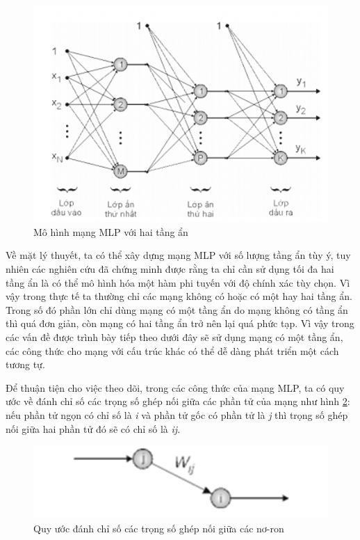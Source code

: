 \begin{figure}[H]
    \centering
    \includegraphics[scale=0.75]{./content/images/2-3.png}
    \caption{Mô hình mạng MLP với hai tầng ẩn}
    \label{fig:2-3}
\end{figure}

Về mặt lý thuyết, ta có thể xây dựng mạng MLP với số lượng tầng ẩn tùy ý, tuy nhiên các nghiên cứu đã chứng minh được rằng ta chỉ cần sử dụng tối đa hai tầng ẩn là có thể mô hình hóa một hàm phi tuyến với độ chính xác tùy chọn. Vì vậy trong thực tế ta thường chỉ các mạng không có hoặc có một hay hai tầng ẩn. Trong số đó phần lớn chỉ dùng mạng có một tầng ẩn do mạng không có tầng ẩn thì quá đơn giản, còn mạng có hai tầng ẩn trở nên lại quá phức tạp. Vì vậy trong các vấn đề được trình bày tiếp theo dưới đây sẽ sử dụng mạng có một tầng ẩn, các công thức cho mạng với cấu trúc khác có thể dễ dàng phát triển một cách tương tự.

Để thuận tiện cho việc theo dõi, trong các công thức của mạng MLP, ta có quy ước về đánh chỉ số các trọng số ghép nối giữa các phần tử của mạng như hình \ref{fig:2-4}: nếu phần tử ngọn có chỉ số là \textit{i} và phần tử gốc có phần tử là \textit{j} thì trọng số ghép nối giữa hai phần tử đó sẽ có chỉ số là \textit{ij}.

\begin{figure}[H]
    \centering
    \includegraphics[scale=0.75]{./content/images/2-4.png}
    \caption{Quy ước đánh chỉ số các trọng số ghép nối giữa các nơ-ron}
    \label{fig:2-4}
\end{figure}

